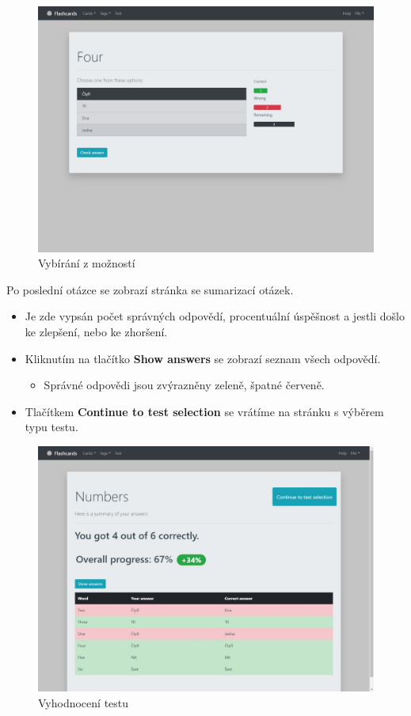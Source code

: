 \documentclass[11pt]{article}
\providecommand{\tightlist}{\setlength{\itemsep}{1pt}\setlength{\parskip}{1pt}}
\begin{document}
\begin{figure}
\centering
\includegraphics{assets/choices.jpg}
\caption{Vybírání z možností}
\end{figure}

Po poslední otázce se zobrazí stránka se sumarizací otázek.

\begin{itemize}
\tightlist
\item
  Je zde vypsán počet správných odpovědí, procentuální úspěšnost a
  jestli došlo ke zlepšení, nebo ke zhoršení.
\item
  Kliknutím na tlačítko \textbf{Show answers} se zobrazí seznam všech
  odpovědí.

  \begin{itemize}
  \tightlist
  \item
    Správné odpovědi jsou zvýrazněny zeleně, špatné červeně.
  \end{itemize}
\item
  Tlačítkem \textbf{Continue to test selection} se vrátíme na stránku s
  výběrem typu testu.
\end{itemize}

\begin{figure}
\centering
\includegraphics{assets/test_end.jpg}
\caption{Vyhodnocení testu}
\end{figure}
\end{document}

